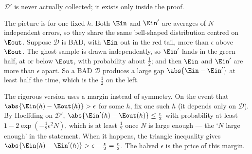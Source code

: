 \(\mathcal{D}'\) is never actually collected; it exists only inside the proof.

\begin{center}
\end{center}

The picture is for one fixed \(h\). Both \(\Ein\) and \(\Ein'\) are averages of
\(N\) independent errors, so they share the same bell-shaped distribution
centred on \(\Eout\). Suppose \(\mathcal{D}\) is BAD, with \(\Ein\) out in the
red tail, more than \(\epsilon\) above \(\Eout\). The ghost sample is drawn
independently, so \(\Ein'\) lands in the green half, at or below \(\Eout\),
with probability about \(\frac{1}{2}\); and then \(\Ein\) and \(\Ein'\) are
more than \(\epsilon\) apart. So a BAD \(\mathcal{D}\) produces a large gap
\(\abs{\Ein - \Ein'}\) at least half the time, which is the \(\frac{1}{2}\) on
the left.

\begin{remark}
    The rigorous version uses a margin instead of symmetry. On the event that
    \(\abs{\Ein(h) - \Eout(h)} > \epsilon\) for some \(h\), fix one such \(h\)
    (it depends only on \(\mathcal{D}\)). By Hoeffding on \(\mathcal{D}'\),
    \(\abs{\Ein'(h) - \Eout(h)} \le \frac{\epsilon}{2}\) with probability at
    least \(1 - 2\exp(-\frac{1}{2} \epsilon^2 N)\), which is at least
    \(\frac{1}{2}\) once \(N\) is large enough --- the `\(N\) large enough' in
    the statement. When it happens, the triangle inequality gives
    \(\abs{\Ein(h) - \Ein'(h)} > \epsilon - \frac{\epsilon}{2} =
    \frac{\epsilon}{2}\). The halved \(\epsilon\) is the price of this margin.
\end{remark}

